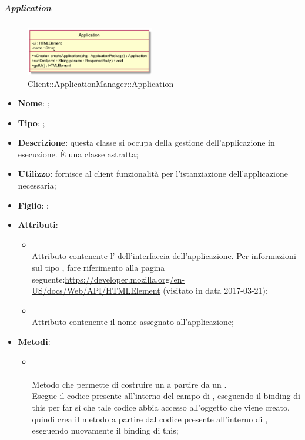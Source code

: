 \hypertarget{Application_label}{\subparagraph{Application}}
\begin{figure}[h]
	\centering
	\includegraphics[width=0.50\textwidth,height=\textheight,keepaspectratio]{images/ClassApplication.png}
	\caption{Client::ApplicationManager::Application}
\end{figure}
\begin{itemize}
	\item \textbf{Nome}: ;
	\item \textbf{Tipo}: ;
	\item \textbf{Descrizione}: questa classe si occupa della gestione dell'applicazione in esecuzione. È una classe astratta;
	\item \textbf{Utilizzo}: fornisce al client funzionalità per l'istanziazione dell'applicazione necessaria;
	\item \textbf{Figlio}: ;
	\item \textbf{Attributi}:
	\begin{itemize}
		\item[]  \\
		Attributo contenente l' dell'interfaccia dell'applicazione. Per informazioni sul tipo , fare riferimento alla pagina seguente:\url{https://developer.mozilla.org/en-US/docs/Web/API/HTMLElement}  (visitato in data 2017-03-21);
		\item[]  \\
		Attributo contenente il nome assegnato all'applicazione;
	\end{itemize}
	\item \textbf{Metodi}:
	\begin{itemize}
		\item[] \\ \\		Metodo che permette di costruire un  a partire da un . \\
Esegue il codice presente all'interno del campo  di , eseguendo il binding di this per far sì che tale codice abbia accesso all'oggetto che viene creato, quindi crea il metodo  a partire dal codice presente all'interno di , eseguendo nuovamente il binding di this;\\

\end{itemize}
\end{itemize}
